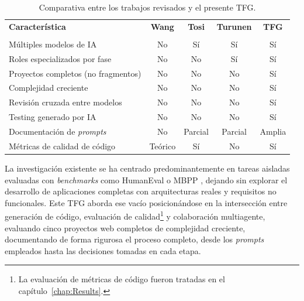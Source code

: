 \begin{table}[htbp]
\centering
\begin{tabular}{lcccc}
\hline
\textbf{Característica} & \textbf{Wang} & \textbf{Tosi} & \textbf{Turunen} & \textbf{TFG} \\
 & \cite{Wang:2023:LLMReview} & \cite{Tosi:2024:CodeQuality} & \cite{Turunen:2023:FromIdeas} & \\
\hline
Múltiples modelos de IA          & No  & Sí  & Sí  & Sí \\
Roles especializados por fase    & No  & No  & Sí  & Sí \\
Proyectos completos (no fragmentos) & No  & No  & No  & Sí \\
Complejidad creciente            & No  & No  & No  & Sí \\
Revisión cruzada entre modelos   & No  & No  & No  & Sí \\
Testing generado por IA          & No  & No  & No  & Sí \\
Documentación de \textit{prompts}         & No  & Parcial & Parcial & Amplia \\
Métricas de calidad de código    & Teórico & Sí  & No  & Sí \\
\hline
\end{tabular}
\caption{Comparativa entre los trabajos revisados y el presente \ac{TFG}.}
\label{tab:comparativa-trabajos}
\end{table}

La investigación existente se ha centrado predominantemente en tareas aisladas evaluadas con \textit{benchmarks} como HumanEval \cite{Chen:2021:Codex} o MBPP \cite{Wang:2023:LLMReview}, dejando sin explorar el desarrollo de aplicaciones completas con arquitecturas reales y requisitos no funcionales. Este \ac{TFG} aborda ese vacío posicionándose en la intersección entre generación de código, evaluación de calidad\footnote{La evaluación de métricas de código fueron tratadas en el capítulo~\ref{chap:Results}.} y colaboración multiagente, evaluando cinco proyectos web completos de complejidad creciente, documentando de forma rigurosa el proceso completo, desde los \textit{prompts} empleados hasta las decisiones tomadas en cada etapa.\\


